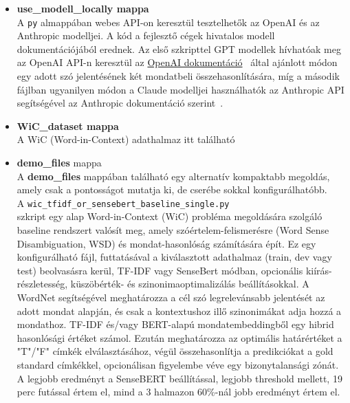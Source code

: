 \documentclass[12pt]{report}
\theoremstyle{definition}
\begin{document}
\begin{itemize}
	\item
	      \textbf{use\_modell\_locally mappa}\\
	     A \texttt{py} almappában webes API-on keresztül tesztelhetők az OpenAI és az Anthropic modelljei. A kód a fejlesztő cégek hivatalos modell dokumentációjából erednek. Az első szkripttel GPT modellek hívhatóak meg az OpenAI API-n keresztül az \href{https://platform.openai.com/docs/overview}{OpenAI dokumentáció}~\cite{openai2025api} által ajánlott módon egy adott szó jelentésének két mondatbeli összehasonlítására, míg a második fájlban ugyanilyen módon a Claude modelljei használhatók az Anthropic API segítségével az Anthropic dokumentáció szerint~\cite{anthropic2025api}.

	\item
	      \textbf{WiC\_dataset mappa}\\
	      A WiC (Word-in-Context) adathalmaz itt található

     \item     \textbf{demo\_files} mappa\\
A \textbf{demo\_files} mappában található egy alternatív kompaktabb megoldás, amely csak a pontosságot mutatja ki, de cserébe sokkal konfigurálhatóbb. \\A \texttt{wic\_tfidf\_or\_sensebert\_baseline\_single.py}\\
szkript egy alap Word-in-Context (WiC) probléma megoldására szolgáló baseline rendszert valósít meg, amely szóértelem-felismerésre (Word Sense Disambiguation, WSD) és mondat-hasonlóság számítására épít. Ez egy konfigurálható fájl, futtatásával a kiválasztott adathalmaz (train, dev vagy test) beolvasásra kerül, TF-IDF vagy SenseBert módban, opcionális kiírás-részletesség, küszöbérték- és szinonimaoptimalizálás beállításokkal.  A WordNet segítségével meghatározza a cél szó legrelevánsabb jelentését az adott mondat alapján, és csak a kontextushoz illő szinonimákat adja hozzá a mondathoz. TF-IDF és/vagy BERT-alapú mondatembeddingből egy hibrid hasonlósági értéket számol. Ezután meghatározza az optimális határértéket a "T"/"F" címkék elválasztásához, végül összehasonlítja a predikciókat a gold standard címkékkel, opcionálisan figyelembe véve egy bizonytalansági zónát. A legjobb eredményt a SenseBERT beállítással, legjobb threshold mellett, 19 perc futással értem el, mind a 3 halmazon 60\%-nál jobb eredményt értem el.
\end{itemize}

\end{document}
